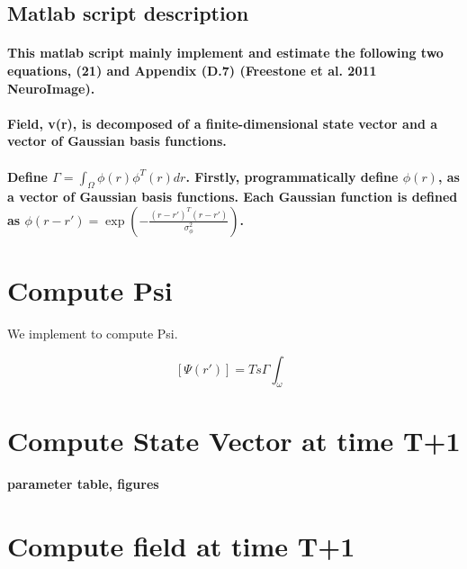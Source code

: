 \documentclass[a4paper, 12pt, english]{article}
\begin{document}
\subsection*{Matlab script description}

\paragraph{This matlab script mainly implement and estimate the following two
equations, (21) and Appendix (D.7) (Freestone et al. 2011 NeuroImage).}

\paragraph{Field, v(r), is decomposed of a finite-dimensional state vector and
a vector of Gaussian basis functions.}

\paragraph{Define $\Gamma=\int_{\Omega}\phi(r)\phi^{T}(r)dr$. Firstly, programmatically
define $\phi(r)$, as a vector of Gaussian basis functions. Each Gaussian
function is defined as $\phi(r-r')=\exp{(-\frac{(r-r')^{T}(r-r')}{\sigma_{\phi}^{2}})}$.}

\newpage



\section{Compute Psi}
We implement to compute Psi.

\[[\Psi(r\prime)] = Ts\Gamma\int_\omega\]

\section{Compute State Vector at time T+1}
\label{state vector}
\paragraph{parameter table, figures}

\newpage





\section{Compute field at time T+1}
\end{document}
